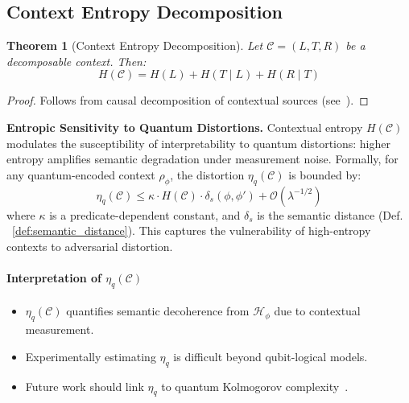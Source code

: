 \documentclass[preprint,12pt]{elsarticle}
\newtheorem{theorem}{Theorem}[section]
\begin{document}
        \subsection{Context Entropy Decomposition}
            \label{subsec:context_entropy_decomp}

            \begin{theorem}[Context Entropy Decomposition] 
                \label{thm:context_entropy_decomp}
                Let $\mathcal{C} = (L, T, R)$ be a decomposable context. Then:
                \begin{equation}\label{eq:context_entropy_decomp}
                    H(\mathcal{C}) = H(L) + H(T \mid L) + H(R \mid T)
                \end{equation}
            \end{theorem}

            \begin{proof}\label{pr:context_entropy_decomp}
                Follows from causal decomposition of contextual sources (see~\cite{Alam2023}).
            \end{proof}

            \textbf{Entropic Sensitivity to Quantum Distortions.} 
            Contextual entropy $H(\mathcal{C})$ modulates the susceptibility of interpretability to quantum distortions: higher entropy amplifies semantic degradation under measurement noise. Formally, for any quantum-encoded context $\rho_\phi$, the distortion $\eta_q(\mathcal{C})$ is bounded by:
            \begin{equation}\label{eq:etaq_H_relation}
                \eta_q(\mathcal{C}) \leq \kappa \cdot H(\mathcal{C}) \cdot \delta_s(\phi, \phi') + \mathcal{O}\left(\lambda^{-1/2}\right)
            \end{equation}
            where $\kappa$ is a predicate-dependent constant, and $\delta_s$ is the semantic distance (Def. ~\ref{def:semantic_distance}). This captures the vulnerability of high-entropy contexts to adversarial distortion.

            \paragraph{Interpretation of $\eta_q(\mathcal{C})$}
            \begin{itemize}
                \item $\eta_q(\mathcal{C})$ quantifies semantic decoherence from $\mathcal{H}_\phi$ due to contextual measurement.
                \item Experimentally estimating $\eta_q$ is difficult beyond qubit-logical models.
                \item Future work should link $\eta_q$ to quantum Kolmogorov complexity~\cite{Berthiaume1997}.
            \end{itemize}
\end{document}

